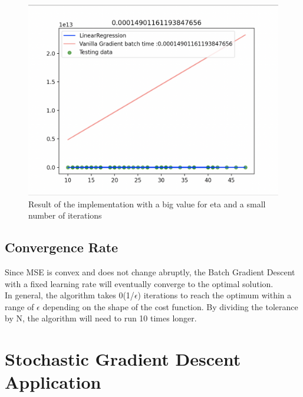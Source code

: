 \documentclass[conference]{IEEEtran}
\begin{document}
\begin{figure}[ht]
    \includegraphics[scale=0.4]{Figures/Fig3.png}
    \caption{Result of the implementation with a big value for eta and a small number of iterations}
    \label{fig:va_gr_ben_eta_big}
\end{figure}


\subsection{Convergence Rate}
Since MSE is convex and does not change abruptly, the
Batch Gradient Descent with a fixed learning rate will eventually converge to the optimal solution. \\
In general, the algorithm takes 0(1/$\epsilon$) iterations to reach the  optimum within a range of $\epsilon$ depending on the shape of the cost function. By dividing the tolerance by N, the algorithm will need to run 10 times longer. \cite{Scikit-Learn}


\section{Stochastic Gradient Descent Application}
\end{document}
